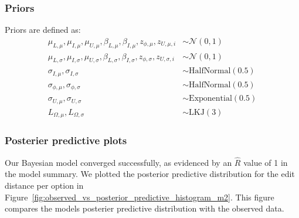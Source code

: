 \subsubsection{Priors}
Priors are defined as:
\begin{align}
    \mu_{L,\mu}, \mu_{I,\mu}, \mu_{U,\mu}, \beta_{L,\mu}, \beta_{I,\mu}, z_{\phi,\mu}, z_{U,\mu,i} &\sim \mathcal{N}(0, 1) \label{eq:priors_distance_model_2_mean} \\
    \mu_{L,\sigma}, \mu_{I,\sigma}, \mu_{U,\sigma}, \beta_{L,\sigma}, \beta_{I,\sigma}, z_{\phi,\sigma}, z_{U,\sigma,i} &\sim \mathcal{N}(0, 1) \label{eq:priors_distance_model_2_variance} \\
    \sigma_{I,\mu}, \sigma_{I,\sigma} &\sim  \text{HalfNormal}(0.5) \label{eq:priors_interface_distance_model_2} \\
    \sigma_{\phi,\mu}, \sigma_{\phi,\sigma} &\sim \text{HalfNormal}(0.5) \label{eq:priors_sigma_phi_distance_model_2} \\
    \sigma_{U,\mu}, \sigma_{U,\sigma} &\sim \text{Exponential}(0.5) \label{eq:priors_sigma_U_distance_model_2} \\
    L_{\Omega,\mu}, L_{\Omega,\sigma} &\sim \text{LKJ}(3) \label{eq:priors_L_Omega_distance_model_2}
\end{align}

\subsubsection{Posterier predictive plots}
Our Bayesian model converged successfully, as evidenced by an $\hat{R}$ value of 1 in the model summary. We plotted the posterior predictive distribution for the edit distance per option in Figure~\ref{fig:observed_vs_posterior_predictive_histogram_m2}. This figure compares the models posterier predictive distribution with the observed data.


